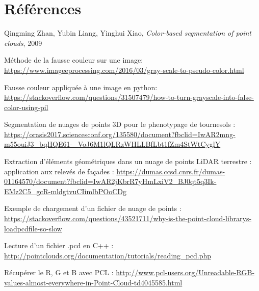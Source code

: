 \documentclass[12pt,titlepage,french]{article}
\newcounter{firstbib}
\begin{document}
\newpage

\section {Références}


\renewcommand{\refname}{Segmentation}
\begin{thebibliography}{3}
 Qingming Zhan, Yubin Liang, Yinghui Xiao, \textit{Color-based segmentation of point clouds}, 2009

\setcounter{firstbib}{\value{enumiv}}
\end{thebibliography}

\renewcommand{\refname}{Fausse couleur}
\begin{thebibliography}{3}
\setcounter{enumiv}{\value{firstbib}}


 Méthode de la fausse couleur sur une image:
\url{https://www.imageeprocessing.com/2016/03/gray-scale-to-pseudo-color.html}

 Fausse couleur appliquée à une image en python:
\url{https://stackoverflow.com/questions/31507479/how-to-turn-grayscale-into-false-color-using-pil}

\setcounter{firstbib}{\value{enumiv}}
\end{thebibliography}


\renewcommand{\refname}{C++}
\begin{thebibliography}{3}
\setcounter{enumiv}{\value{firstbib}}

 Segmentation de nuages de points 3D pour le phenotypage de tournesols :
\url{https://orasis2017.sciencesconf.org/135580/document?fbclid=IwAR2mng-m55ouiJ3_bqHQE61-_VoJ6M1lQLRzWHLLBfLbt1fZm4StWtCyglY}

 Extraction d'éléments géométriques dans un nuage de points LiDAR terrestre : application aux relevés de façades :
\url{https://dumas.ccsd.cnrs.fr/dumas-01164570/document?fbclid=IwAR2jKbrR7yHmLxiV2_BJ0qt5q3Ik-EMz2C5_gcR-mldgtvuCIimlbPOoCDg}

 Exemple de chargement d'un fichier de nuage de points :
\url{https://stackoverflow.com/questions/43521711/why-is-the-point-cloud-librarys-loadpcdfile-so-slow}

 Lecture d'un fichier .pcd en C++ :
\url{http://pointclouds.org/documentation/tutorials/reading_pcd.php}

 Récupérer le R, G et B avec PCL :
\url{http://www.pcl-users.org/Unreadable-RGB-values-almost-everywhere-in-Point-Cloud-td4045585.html}

\setcounter{firstbib}{\value{enumiv}}
\end{thebibliography}
\end{document}
